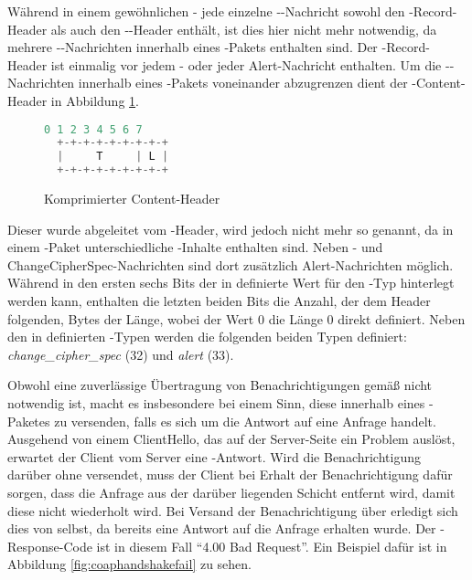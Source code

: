 Während in einem gewöhnlichen - jede einzelne --Nachricht sowohl den -Record-Header als auch den
--Header enthält, ist dies hier nicht mehr notwendig, da mehrere --Nachrichten innerhalb eines -Pakets
enthalten sind. Der -Record-Header ist einmalig vor jedem - oder jeder Alert-Nachricht enthalten. Um die --Nachrichten
innerhalb eines -Pakets voneinander abzugrenzen dient der -Content-Header in Abbildung \ref{fig:com_content_header}.

\begin{figure}[ht]
  \centering
  \begin{lstlisting}[language=c]
   0 1 2 3 4 5 6 7
  +-+-+-+-+-+-+-+-+
  |     T     | L |
  +-+-+-+-+-+-+-+-+
  \end{lstlisting}
  \caption{Komprimierter Content-Header}
  \label{fig:com_content_header}
\end{figure}

Dieser wurde abgeleitet vom -Header, wird jedoch nicht mehr so genannt, da in einem -Paket unterschiedliche -Inhalte
enthalten sind. Neben - und ChangeCipherSpec-Nachrichten sind dort zusätzlich Alert-Nachrichten möglich. Während in den ersten sechs Bits der in
 definierte Wert für den -Typ hinterlegt werden kann, enthalten die letzten beiden Bits die Anzahl, der dem Header folgenden,
Bytes der Länge, wobei der Wert 0 die Länge 0 direkt definiert. Neben den in  definierten -Typen werden die folgenden
beiden Typen definiert: \textit{change\_cipher\_spec} (32) und \textit{alert} (33).

Obwohl eine zuverlässige Übertragung von Benachrichtigungen gemäß  nicht notwendig ist, macht es insbesondere bei einem  Sinn, diese
innerhalb eines -Paketes zu versenden, falls es sich um die Antwort auf eine Anfrage handelt. Ausgehend von einem ClientHello, das
auf der Server-Seite ein Problem auslöst, erwartet der Client vom Server eine -Antwort. Wird die Benachrichtigung darüber ohne  versendet,
muss der Client bei Erhalt der Benachrichtigung dafür sorgen, dass die Anfrage aus der darüber liegenden  Schicht entfernt wird, damit diese
nicht wiederholt wird. Bei Versand der Benachrichtigung über  erledigt sich dies von selbst, da bereits eine Antwort auf die Anfrage erhalten wurde.
Der -Response-Code ist in diesem Fall "`4.00 Bad Request"'. Ein Beispiel dafür ist in Abbildung \ref{fig:coaphandshakefail} zu sehen.

